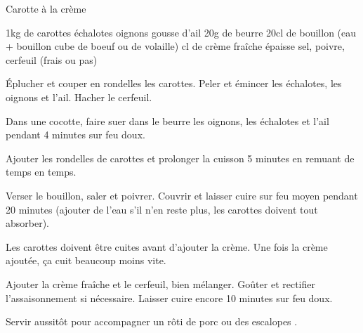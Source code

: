\begin{recette}{Carotte à la crème}
\begin{ingredients}
\ingredient  1kg de carottes
 échalotes
 oignons
 gousse d'ail
\ingredient 20g de beurre
\ingredient 20cl de bouillon (eau + bouillon cube de boeuf ou de volaille)
 cl de crème fraîche épaisse
\ingredient sel, poivre, cerfeuil (frais ou pas)
\end{ingredients}

\begin{preparation}
\etape Éplucher et couper en rondelles les carottes. Peler et émincer les échalotes, les oignons et l’ail. Hacher le cerfeuil.

\etape Dans une cocotte, faire suer dans le beurre les oignons, les échalotes et l’ail pendant 4 minutes sur feu doux.

\etape Ajouter les rondelles de carottes et prolonger la cuisson 5 minutes en remuant de temps en temps.

\etape Verser le bouillon, saler et poivrer. Couvrir et laisser cuire sur feu moyen pendant 20 minutes (ajouter de l'eau s'il n'en reste plus, les carottes doivent tout absorber).

\begin{remarque}
Les carottes doivent être cuites avant d'ajouter la crème. Une fois la crème ajoutée, ça cuit beaucoup moins vite.
\end{remarque}

\etape Ajouter la crème fraîche et le cerfeuil, bien mélanger. Goûter et rectifier l’assaisonnement si nécessaire. Laisser cuire encore 10 minutes sur feu doux.

\etape Servir aussitôt pour accompagner un rôti de porc ou des escalopes .
\end{preparation}

\end{recette}

